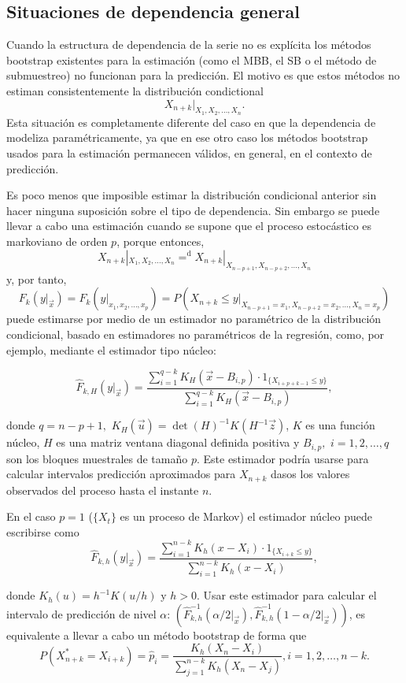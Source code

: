 \documentclass[]{book}
\theoremstyle{definition}
\theoremstyle{definition}
\theoremstyle{definition}
\theoremstyle{remark}
\begin{document}
\subsection{Situaciones de dependencia
general}\label{situaciones-de-dependencia-general-2}

Cuando la estructura de dependencia de la serie no es explícita los
métodos bootstrap existentes para la estimación (como el MBB, el SB o el
método de submuestreo) no funcionan para la predicción. El motivo es que
estos métodos no estiman consistentemente la distribución
condictional\[X_{n+k}|_{X_1,X_2,\ldots ,X_n}.\]Esta situación es
completamente diferente del caso en que la dependencia de modeliza
paramétricamente, ya que en ese otro caso los métodos bootstrap usados
para la estimación permanecen válidos, en general, en el contexto de
predicción.

Es poco menos que imposible estimar la distribución condicional anterior
sin hacer ninguna suposición sobre el tipo de dependencia. Sin embargo
se puede llevar a cabo una estimación cuando se supone que el proceso
estocástico es markoviano de orden \(p\), porque entonces,
\[X_{n+k}|_{X_1,X_2,\ldots ,X_n}{=}^{\mathrm{d}
}X_{n+k}|_{X_{n-p+1},X_{n-p+2},\ldots ,X_n}\]y, por tanto,
\[F_{k}(y|_{\vec{x}})=F_{k}(y|_{x_1,x_2,\ldots ,x_{p}})=P\left(
X_{n+k}\leq y|_{X_{n-p+1}=x_1,X_{n-p+2}=x_2,\ldots ,X_n=x_{p}} \right)\]puede
estimarse por medio de un estimador no paramétrico de la distribución
condicional, basado en estimadores no paramétricos de la regresión,
como, por ejemplo, mediante el estimador tipo núcleo:

\[\widehat{F}_{k,H}(y|_{\vec{x}})=\frac{\sum_{i=1}^{q-k}K_{H}(\vec{x}
-B_{i,p})\cdot 1_{\{X_{i+p+k-1}\leq y\}}}{\sum_{i=1}^{q-k}K_{H}(\vec{x}
-B_{i,p})},\]

donde \(q=n-p+1,\) \(K_{H}(\vec{u})=\det (H)^{-1}K(H^{-1}\vec{z})\),
\(K\) es una función núcleo, \(H\) es una matriz ventana diagonal
definida positiva y \(B_{i,p},\) \(i=1,2,\ldots ,q\) son los bloques
muestrales de tamaño \(p\). Este estimador podría usarse para calcular
intervalos predicción aproximados para \(X_{n+k}\) dasos los valores
observados del proceso hasta el instante \(n\).

En el caso \(p=1\) (\(\{X_{t}\}\) es un proceso de Markov) el estimador
núcleo puede escribirse
como\[\widehat{F}_{k,h}(y|_{\vec{x}})=\frac{\sum_{i=1}^{n-k}K_{h}(x-X_i)\cdot
1_{\{X_{i+k}\leq y\}}}{\sum_{i=1}^{n-k}K_{h}(x-X_i)},\]

donde \(K_{h}(u)=h^{-1}K(u/h)\) y \(h>0\). Usar este estimador para
calcular el intervalo de predicción de nivel \(\alpha\):
\(\left( \widehat{F} _{k,h}^{-1}(\alpha /2|_{\vec{x}}),\widehat{F}_{k,h}^{-1}(1-\alpha /2|_{\vec{x }}) \right)\),
es equivalente a llevar a cabo un método bootstrap de forma
que\[P\left( X_{n+k}^{\ast}=X_{i+k} \right) =\widehat{p}_i=\frac{
K_{h}(X_n-X_i)}{\sum_{j=1}^{n-k}K_{h}(X_n-X_j)}\mathrm{,}
i=1,2,\ldots ,n-k.\]
\end{document}
